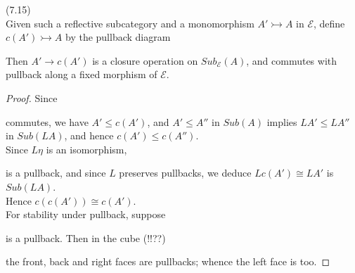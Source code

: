 \documentclass[a4paper]{article}
\begin{document}
\begin{lemma} (7.15)\\
    Given such a reflective subcategory and a monomorphism $A'\rightarrowtail A$ in $\mathcal{E}$, define $c(A') \rightarrowtail A$ by the pullback diagram


    Then $A' \rightarrow c(A')$ is a closure operation on $Sub_\mathcal{E}(A)$, and commutes with pullback along a fixed morphism of $\mathcal{E}$.
    \begin{proof}
        Since


        commutes, we have $A' \leq c(A')$, and $A' \leq A''$ in $Sub(A)$ implies $LA' \leq LA''$ in $Sub(LA)$, and hence $c(A') \leq c(A'')$.\\
        Since $L\eta$ is an isomorphism,


        is a pullback, and since $L$ preserves pullbacks, we deduce $Lc(A') \cong LA'$ is $Sub(LA)$.\\
        Hence $c(c(A')) \cong c(A')$.\\
        For stability under pullback, suppose


        is a pullback. Then in the cube (!!??)


        the front, back and right faces are pullbacks; whence the left face is too.
    \end{proof}
\end{lemma}
\end{document}
